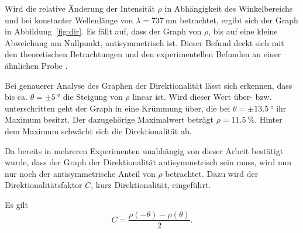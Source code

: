 Wird die relative Änderung der Intensität $\rho$ in Abhängigkeit des Winkelbereichs und bei 
konstanter Wellenlänge von $\lambda = \SI{737}{\nano\meter}$
betrachtet, ergibt sich der Graph in Abbildung~\ref{fig:dir}.
Es fällt auf, dass 
der Graph von $\rho$, bis auf eine kleine Abweichung am Nullpunkt,
antisymmetrisch ist.
Dieser Befund deckt sich mit den theoretischen Betrachtungen 
und den experimentellen Befunden an einer ähnlichen Probe \cite{felix}.

Bei genauerer Analyse des Graphen der Direktionalität lässt sich erkennen, dass bis ca. $\theta = \pm \SI{5}{\degree}$
die Steigung von $\rho$ linear ist.
Wird dieser Wert über- bzw. unterschritten geht der Graph in eine Krümmung über, die bei $\theta = \pm \SI{13,5}{\degree}$
ihr Maximum besitzt. 
Der dazugehörige Maximalwert beträgt $\rho = \SI{11,5}{\percent}$. 
Hinter dem Maximum schwächt sich die Direktionalität ab.

Da bereits in mehreren Experimenten unabhängig von dieser Arbeit bestätigt wurde, dass der Graph
der Direktionalität antisymmetrisch sein muss, wird nun nur noch der antisymmetrische Anteil von $\rho$ betrachtet.  
Dazu wird der Direktionalitätsfaktor $C$, kurz Direktionalität, eingeführt. 

Es gilt 
\begin{equation}
    C= \frac{\rho(-\theta)-\rho(\theta)}{2}.
    \label{eq:C} 
\end{equation}

